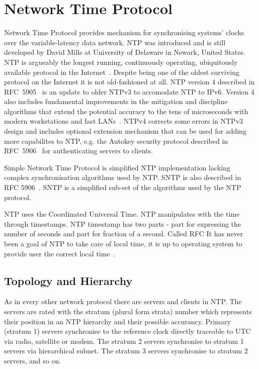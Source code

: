 
\chapter{Network Time Protocol}
Network Time Protocol provides mechanism for synchronising systems' clocks over the variable-latency data network.
NTP was introduced and is still developed by David Mills at University of Delaware in Newark, United States.
NTP is argueably the longest running, continuously operating,
ubiquitously available protocol in the Internet~\cite{ntp-overview}.
Despite being one of the oldest surviving protocol on the Internet it is not old-fashioned at all.
NTP version 4 described in RFC~5905~\cite{rfc5905} is an update to older NTPv3 to accomodate NTP to IPv6.
Version 4 also includes fundamental improvements in
the mitigation and discipline algorithms that extend
the potential accuracy to the tens of microseconds with modern
workstations and fast LANs~\cite{rfc5905}.
NTPv4 corrects some
errors in NTPv3 design and includes optional extension mechanism
that can be used for adding more capabilites to NTP, e.g. the
Autokey security protocol described in RFC~5906~\cite{rfc5906}
for authenticating servers to clients.

Simple Network Time Protocol is simplified NTP implementation lacking complex
synchronisation algorithms used by NTP. SNTP is also described in RFC 5906~\cite{rfc5906}.
SNTP is a simplified sub-set of the algorithms used by the NTP protocol.

NTP uses the Coordinated Universal Time.
NTP manipulates with the time through timestamps.
NTP timestamp has two parts - part for expressing the number of seconds
and part for fraction of a second. \!Called RFC
It has never been a goal of NTP to take care of local time,
it is up to operating system to provide user the correct local time~\cite{ntp-overview}.

\section{Topology and Hierarchy}
As in every other network protocol there are servers and clients in NTP.
The servers are rated with the stratum (plural form strata) number which represents their position
in an NTP hierarchy and their possible accurancy.
Primary (stratum 1) servers synchronise to the reference clock directly traceable to UTC via
radio, satellite or modem.
The stratum 2 servers synchronise to stratum 1
servers via hierarchical subnet.
The stratum 3 servers synchronise to stratum 2 servers, and so on.

